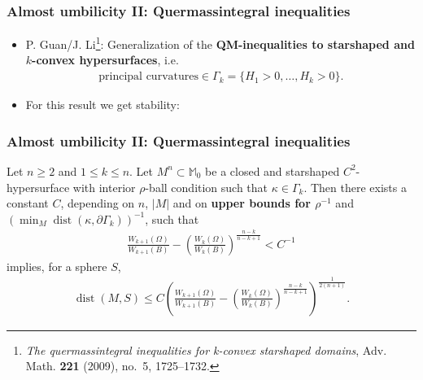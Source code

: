 \documentclass{beamer}
\newcommand{\sub}{\subset}
\newcommand{\bbM}{\mathbb{M}}
\newcommand{\8}{\infty}
\newcommand{\ka}{\kappa}
\newcommand{\Om}{\Omega}
\newcommand{\Ga}{\Gamma}
\newcommand{\del}{\partial}
\newcommand{\fr}[2]{\frac{#1}{#2}}
\DeclareMathOperator{\dist}{dist}
\newcommand{\eq}[1]{\begin{equation}\begin{alignedat}{2} #1 \end{alignedat}\end{equation}}
\newcommand{\br}[1]{\left(#1\right)}
\newcommand{\abs}[1]{\lvert #1\rvert}
\begin{document}
\begin{frame} 
\frametitle{Almost umbilicity II: Quermassintegral inequalities}
\begin{itemize}
	\item[] P. Guan/J. Li\footnote{\emph{The quermassintegral inequalities for
  k-convex starshaped domains}, Adv. Math. \textbf{221} (2009), no.~5,
  1725--1732.}: Generalization of the {\bf{QM-inequalities to starshaped and $k$-convex hypersurfaces}}, i.e.
	\eq{\mbox{principal curvatures}\in \Ga_{k} = \{H_{1}>0,\dots, H_{k}>0\}.}
	\item[] For this result we get stability:
	
	
\end{itemize}
\end{frame}

\begin{frame} 
\frametitle{Almost umbilicity II: Quermassintegral inequalities}

\begin{theorem}
Let $n\geq 2$ and $1\leq k\leq n$. Let $M^{n}\sub\bbM_{0}$ be a closed and starshaped $C^{2}$-hypersurface with interior $\rho$-ball condition such that $\ka\in \Ga_{k}$. Then there exists a constant $C$, depending on $n$, $\abs{M}$ and on {\bf upper bounds for $\rho^{-1}$} and $(\min_{M}\dist(\ka,\del\Ga_{k}))^{-1}$, such that
\eq{\fr{W_{k+1}(\Om)}{W_{k+1}(B)}-\br{\fr{W_{k}(\Om)}{W_{k}(B)}}^{\fr{n-k}{n-k+1}}<C^{-1}}
 implies, for a sphere $S$,
\eq{\dist(M,S)\leq C\br{\fr{W_{k+1}(\Om)}{W_{k+1}(B)}-\br{\fr{W_{k}(\Om)}{W_{k}(B)}}^{\fr{n-k}{n-k+1}}}^{\fr{1}{2(n+1)}}. }
\end{theorem}

\end{frame}
\end{document}
